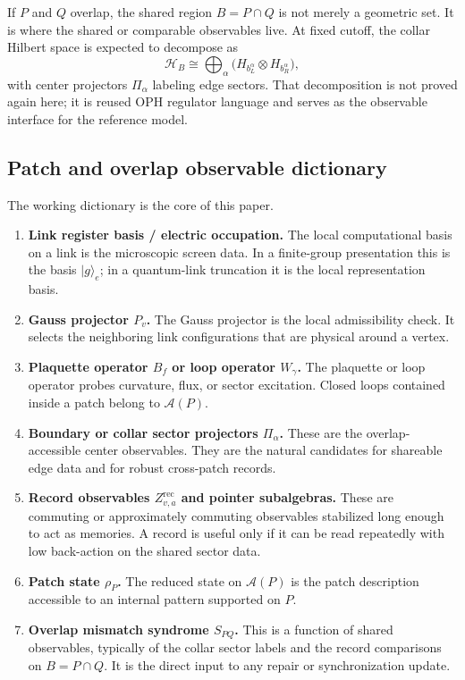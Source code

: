 \documentclass[11pt]{article}
\begin{document}
If $P$ and $Q$ overlap, the shared region $B=P\cap Q$ is not merely a geometric set. It is
where the shared or comparable observables live. At fixed cutoff, the collar Hilbert space is
expected to decompose as
\begin{equation}
\mathcal H_B \cong \bigoplus_{\alpha}
\bigl(H_{b_L^{\alpha}}\otimes H_{b_R^{\alpha}}\bigr),
\end{equation}
with center projectors $\Pi_{\alpha}$ labeling edge sectors. That decomposition is not proved
again here; it is reused OPH regulator language and serves as the observable interface for the
reference model.

\subsection{Patch and overlap observable dictionary}

The working dictionary is the core of this paper.

\begin{enumerate}[leftmargin=2em]
\item \textbf{Link register basis / electric occupation.}
The local computational basis on a link is the microscopic screen data. In a finite-group
presentation this is the basis $|g\rangle_e$; in a quantum-link truncation it is the local
representation basis.

\item \textbf{Gauss projector $P_v$.}
The Gauss projector is the local admissibility check. It selects the neighboring link
configurations that are physical around a vertex.

\item \textbf{Plaquette operator $B_f$ or loop operator $W_\gamma$.}
The plaquette or loop operator probes curvature, flux, or sector excitation. Closed loops
contained inside a patch belong to $\mathcal A(P)$.

\item \textbf{Boundary or collar sector projectors $\Pi_{\alpha}$.}
These are the overlap-accessible center observables. They are the natural candidates for
shareable edge data and for robust cross-patch records.

\item \textbf{Record observables $Z^{\mathrm{rec}}_{v,a}$ and pointer subalgebras.}
These are commuting or approximately commuting observables stabilized long enough to act as
memories. A record is useful only if it can be read repeatedly with low back-action on the
shared sector data.

\item \textbf{Patch state $\rho_P$.}
The reduced state on $\mathcal A(P)$ is the patch description accessible to an internal
pattern supported on $P$.

\item \textbf{Overlap mismatch syndrome $S_{PQ}$.}
This is a function of shared observables, typically of the collar sector labels and the record
comparisons on $B=P\cap Q$. It is the direct input to any repair or synchronization update.
\end{enumerate}
\end{document}
